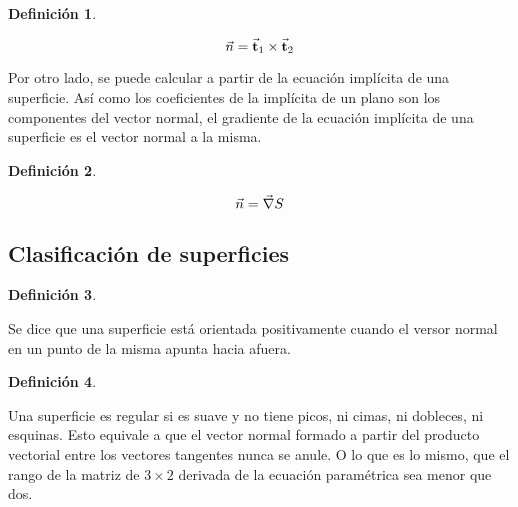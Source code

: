 \documentclass[a5paper,12pt,twoside]{book}
\newtheorem{defn}{{Definición}}[chapter]
\begin{document}
\begin{mdframed}[style=MyFrame1]
    \begin{defn}
    \end{defn}
    \begin{equation*}
        \Vec{n} = \Vec{\textbf{t}}_1 \times \Vec{\textbf{t}}_2
    \end{equation*}
\end{mdframed}

Por otro lado, se puede calcular a partir de la ecuación implícita de una superficie. Así como los coeficientes de la implícita de un plano son los componentes del vector normal, el gradiente de la ecuación implícita de una superficie es el vector normal a la misma.

\begin{mdframed}[style=MyFrame1]
    \begin{defn}
    \end{defn}
    \begin{equation*}
        \Vec{n} = \Vec{\nabla} S
    \end{equation*}
\end{mdframed}


\subsection{Clasificación de superficies}

\begin{mdframed}[style=MyFrame1]
    \begin{defn}
    \end{defn}
\end{mdframed}

Se dice que una superficie está orientada positivamente cuando el versor normal en un punto de la misma apunta hacia afuera.

\begin{mdframed}[style=MyFrame1]
    \begin{defn}
    \end{defn}
\end{mdframed}

Una superficie es regular si es suave y no tiene picos, ni cimas, ni dobleces, ni esquinas. Esto equivale a que el vector normal formado a partir del producto vectorial entre los vectores tangentes nunca se anule. O lo que es lo mismo, que el rango de la matriz de $3 \times 2$ derivada de la 
ecuación paramétrica sea menor que dos.
\end{document}
